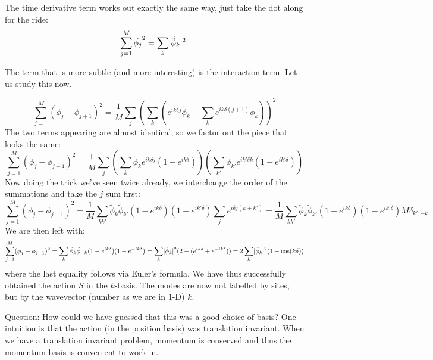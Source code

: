 The time derivative term works out exactly the same way, just take the dot along for the ride:
\begin{equation}
    \sum_{j=1}^M \dot{\phi_j}^2 = \sum_{k}\lvert \dot{\tilde{\phi}}_k \rvert^2.
\end{equation}

The term that is more subtle (and more interesting) is the interaction term. Let us study this now.

\begin{equation}
    \sum_{j=1}^M (\phi_j - \phi_{j+1})^2 = \frac{1}{M}\sum_j \left(\sum_k \left(e^{ik\delta j}\tilde{\phi}_k - \sum_k e^{ik\delta(j+1)}\tilde{\phi}_{k}\right)\right)^2
\end{equation}
The two terms appearing are almost identical, so we factor out the piece that looks the same:
\begin{equation}
    \sum_{j=1}^M (\phi_j - \phi_{j+1})^2 = \frac{1}{M}\sum_j \left(\sum_k \tilde{\phi}_k e^{ik\delta j}\left(1 - e^{ik\delta}\right)\right)\left(\sum_{k'}\tilde{\phi}_{k'}e^{ik'\delta k}(1 - e^{ik'\delta})\right)
\end{equation}
Now doing the trick we've seen twice already, we interchange the order of the summations and take the $j$ sum first:
\begin{equation}
    \sum_{j=1}^M (\phi_j - \phi_{j+1})^2 = \frac{1}{M}\sum_{kk'}\tilde{\phi}_k \tilde{\phi}_{k'}(1 - e^{ik\delta})(1-e^{ik'\delta})\sum_j e^{i\delta j(k+k')} = \frac{1}{M}\sum_{kk'}\tilde{\phi}_k \tilde{\phi}_{k'}(1 - e^{ik\delta})(1-e^{ik'\delta}) M\delta_{k',-k}
\end{equation}
We are then left with:
\begin{equation}
    \sum_{j=1}^M (\phi_j - \phi_{j+1})^2 = \sum_{k}\tilde{\phi}_k\tilde{\phi}_{-k}(1 - e^{ik\delta})(1-e^{-ik\delta}) = \sum_{k}\lvert \tilde{\phi}_k \rvert^2 (2 - (e^{ik\delta} + e^{-ik\delta})) = 2\sum_k \lvert \tilde{\phi}_k \rvert^2(1-\cos(k \delta))
\end{equation}
where the last equality follows via Euler's formula. We have thus successfully obtained the action $S$ in the $k$-basis. The modes are now not labelled by sites, but by the wavevector (number as we are in 1-D) $k$. 

Question: How could we have guessed that this was a good choice of basis? One intuition is that the action (in the position basis) was translation invariant. When we have a translation invariant problem, momentum is conserved and thus the momentum basis is convenient to work in.


